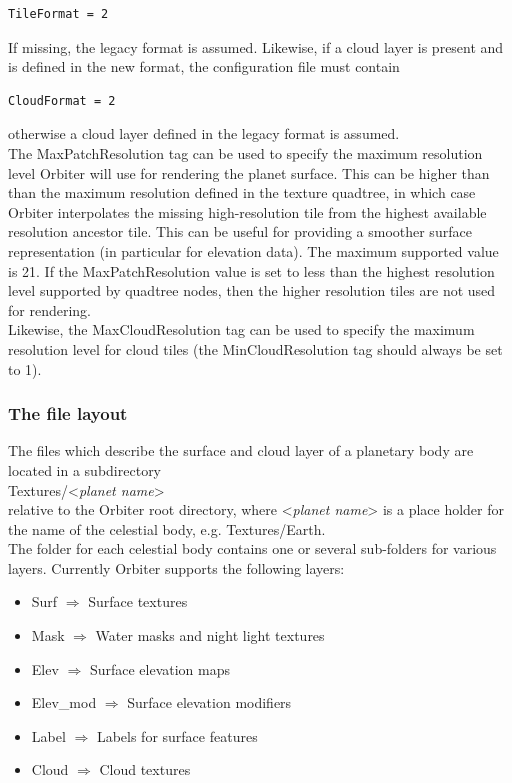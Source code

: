 \documentclass[Orbiter Developer Manual.tex]{subfiles}
\begin{document}
\begin{lstlisting}[language=OSFS]
TileFormat = 2
\end{lstlisting}

\noindent
If missing, the legacy format is assumed. Likewise, if a cloud layer is present and is defined in the new format, the configuration file must contain

\begin{lstlisting}[language=OSFS]
CloudFormat = 2
\end{lstlisting}

\noindent
otherwise a cloud layer defined in the legacy format is assumed.\\
The MaxPatchResolution tag can be used to specify the maximum resolution level Orbiter will use for rendering the planet surface. This can be higher than than the maximum resolution defined in the texture quadtree, in which case Orbiter interpolates the missing high-resolution tile from the highest available resolution ancestor tile. This can be useful for providing a smoother surface representation (in particular for elevation data). The maximum supported value is 21. If the MaxPatchResolution value is set to less than the highest resolution level supported by quadtree nodes, then the higher resolution tiles are not used for rendering.\\
Likewise, the MaxCloudResolution tag can be used to specify the maximum resolution level for cloud tiles (the MinCloudResolution tag should always be set to 1).


\subsubsection{The file layout}
\label{sssec:tile_file_layout}
The files which describe the surface and cloud layer of a planetary body are located in a subdirectory\\
\indent Textures/<\textit{planet name}>\\
relative to the Orbiter root directory, where <\textit{planet name}> is a place holder for the name of the celestial body, e.g. Textures/Earth.\\
The folder for each celestial body contains one or several sub-folders for various layers. Currently Orbiter supports the following layers:

\begin{itemize}
\item Surf $\Rightarrow$ Surface textures
\item Mask $\Rightarrow$ Water masks and night light textures
\item Elev $\Rightarrow$ Surface elevation maps
\item Elev\_mod $\Rightarrow$ Surface elevation modifiers
\item Label $\Rightarrow$ Labels for surface features
\item Cloud $\Rightarrow$ Cloud textures
\end{itemize}
\end{document}
